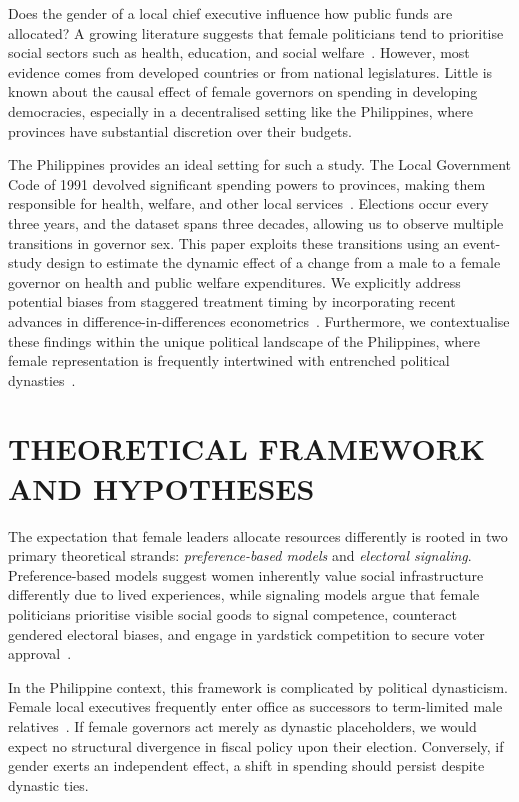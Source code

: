 \documentclass[conference]{IEEEtran}
\begin{document}
Does the gender of a local chief executive influence how public funds are allocated? A growing literature suggests that female politicians tend to prioritise social sectors such as health, education, and social welfare~\cite{chattopadhyay2004women, brollo2017gender}. However, most evidence comes from developed countries or from national legislatures. Little is known about the causal effect of female governors on spending in developing democracies, especially in a decentralised setting like the Philippines, where provinces have substantial discretion over their budgets.

The Philippines provides an ideal setting for such a study. The Local Government Code of 1991 devolved significant spending powers to provinces, making them responsible for health, welfare, and other local services~\cite{lgc1991}. Elections occur every three years, and the dataset spans three decades, allowing us to observe multiple transitions in governor sex. This paper exploits these transitions using an event-study design to estimate the dynamic effect of a change from a male to a female governor on health and public welfare expenditures. We explicitly address potential biases from staggered treatment timing by incorporating recent advances in difference-in-differences econometrics~\cite{callaway2021difference}. Furthermore, we contextualise these findings within the unique political landscape of the Philippines, where female representation is frequently intertwined with entrenched political dynasties~\cite{querubin2016family}.

\section{THEORETICAL FRAMEWORK AND HYPOTHESES}

The expectation that female leaders allocate resources differently is rooted in two primary theoretical strands: \textit{preference-based models} and \textit{electoral signaling}. Preference-based models suggest women inherently value social infrastructure differently due to lived experiences, while signaling models argue that female politicians prioritise visible social goods to signal competence, counteract gendered electoral biases, and engage in yardstick competition to secure voter approval~\cite{brollo2017gender, besley1995incumbent}.

In the Philippine context, this framework is complicated by political dynasticism. Female local executives frequently enter office as successors to term-limited male relatives~\cite{querubin2016family, panao2021beyond}. If female governors act merely as dynastic placeholders, we would expect no structural divergence in fiscal policy upon their election. Conversely, if gender exerts an independent effect, a shift in spending should persist despite dynastic ties.
\end{document}
